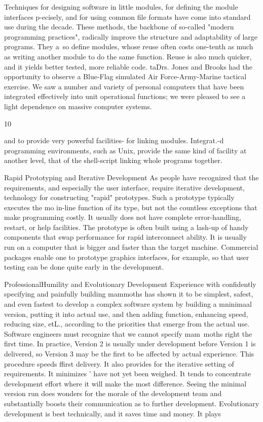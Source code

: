 \documentclass[12pt]{article}
\begin{document}
Techniques for designing software in little modules, for defining the module interfaces
p-ecisely, and for using common file formats have come into standard use during the
decade. These methods, the backbone of so-called "modern programming practices",
radically improve the structure and adaptability of large programs. They a~so define
modules, whose reuse often costs one-tenth as much as writing another module to do the
same function. Reuse is also much quicker, and it yields better tested, more reliable code.
taDrs. Jones and Brooks had the opportunity to observe a Blue-Flag simulated Air
Force-Army-Marine tactical exercise. We saw a number and variety of personal computers
that have been integrated effectively into unit operational functions; we were pleased to
see a light dependence on massive computer systems.

10

and to provide very powerful facilities- for linking modules. Integrat.-d programming
environments, such as Unix, provide the same kind of facility at another level, that of
the shell-script linking whole programs together.

Rapid Prototyping and Iterative Development
As people have recognized that the requirements, and especially the user interface,
require iterative development, %
technology for constructing "rapid" prototypes. Such a prototype typically executes the
mo in-line function of its type, but not the countless exceptions that make programming
costly. It usually does not have complete error-handling, restart, or help facilities. The
prototype is often built using a lash-up of handy components that swap performance for
rapid interconnect ability. It is usually run on a computer that is bigger and faster than
the target machine.
Commercial packages enable one to prototype graphics interfaces, for example, so that
user testing can be done quite early in the development.

ProfessionalHumility and Evolutionary Development
Experience with confidently specifying and painfully building mammoths has shown it
to be simplest, safest, and even fastest to develop a complex software system by building
a mninimaal version, putting it into actual use, and then adding function, enhancing speed,
reducing size, etL., according to the priorities that emerge from the actual use. Software
engineers must recognize that we cannot specify mam~moths right the first time. In practice,
Version 2 is usually under development before Version 1 is delivered, so Version 3 may be
the first to be affected by actual experience.
This procedure speeds ffirst delivery. It also provides for the iterative setting of
requirements. It minimizes '%
have not yet been weighed. It tends to concentrate development effort where it will make
the most difference. Seeing the minimal version run does wonders for the morale of the
development team and substantially boosts their communication as to further development.
Evolutionary development is best technically, and it saves time and money. It plays
\end{document}
